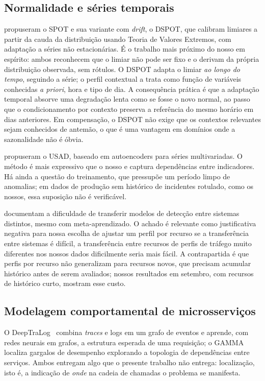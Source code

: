 \documentclass[sigconf,nonacm]{acmart}
\begin{document}
\subsection{Normalidade e séries temporais}
\citet{siffer2017spot} propuseram o SPOT e sua variante com \emph{drift}, o DSPOT, que calibram limiares a partir da cauda da distribuição usando Teoria de Valores Extremos, com adaptação a séries não estacionárias. É o trabalho mais próximo do nosso em espírito: ambos reconhecem que o limiar não pode ser fixo e o derivam da própria distribuição observada, sem rótulos. O DSPOT adapta o limiar \emph{ao longo do tempo}, seguindo a série; o perfil contextual a trata como função de variáveis conhecidas \emph{a priori}, hora e tipo de dia. A consequência prática é que a adaptação temporal absorve uma degradação lenta como se fosse o novo normal, ao passo que o condicionamento por contexto preserva a referência do mesmo horário em dias anteriores. Em compensação, o DSPOT não exige que os contextos relevantes sejam conhecidos de antemão, o que é uma vantagem em domínios onde a sazonalidade não é óbvia.

\citet{audibert2020usad} propuseram o USAD, baseado em autoencoders para séries multivariadas. O método é mais expressivo que o nosso e captura dependências entre indicadores. Há ainda a questão do treinamento, que pressupõe um período limpo de anomalias; em dados de produção sem histórico de incidentes rotulado, como os nossos, essa suposição não é verificável.

\citet{wang2025crosssystem} documentam a dificuldade de transferir modelos de detecção entre sistemas distintos, mesmo com meta-aprendizado. O achado é relevante como justificativa negativa para nossa escolha de ajustar um perfil por recurso se a transferência entre sistemas é difícil, a transferência entre recursos de perfis de tráfego muito diferentes nos nossos dados dificilmente seria mais fácil. A contrapartida é que perfis por recurso não generalizam para recursos novos, que precisam acumular histórico antes de serem avaliados; nossos resultados em setembro, com recursos de histórico curto, mostram esse custo.


\subsection{Modelagem comportamental de microsserviços}
O DeepTraLog~\citep{zhang2022deeptralog} combina \emph{traces} e logs em um grafo de eventos e aprende, com redes neurais em grafos, a estrutura esperada de uma requisição; o GAMMA~\citep{somashekar2024gamma} localiza gargalos de desempenho explorando a topologia de dependências entre serviços. Ambos entregam algo que o presente trabalho não entrega: localização, isto é, a indicação de \emph{onde} na cadeia de chamadas o problema se manifesta.
\end{document}
